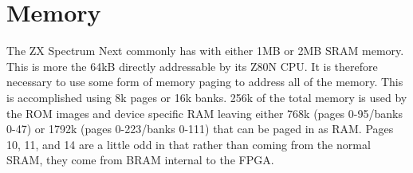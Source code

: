 \chapter{Memory}
The ZX Spectrum Next commonly has with either 1MB or 2MB SRAM
memory. This is more the 64kB directly addressable by its Z80N CPU. It
is therefore necessary to use some form of memory paging to address
all of the memory. This is accomplished using 8k pages or 16k
banks. 256k of the total memory is used by the ROM images and device
specific RAM leaving either 768k (pages 0-95/banks 0-47) or 1792k
(pages 0-223/banks 0-111) that can be paged in as RAM. Pages 10, 11,
and 14 are a little odd in that rather than coming from the normal
SRAM, they come from BRAM internal to the FPGA.



